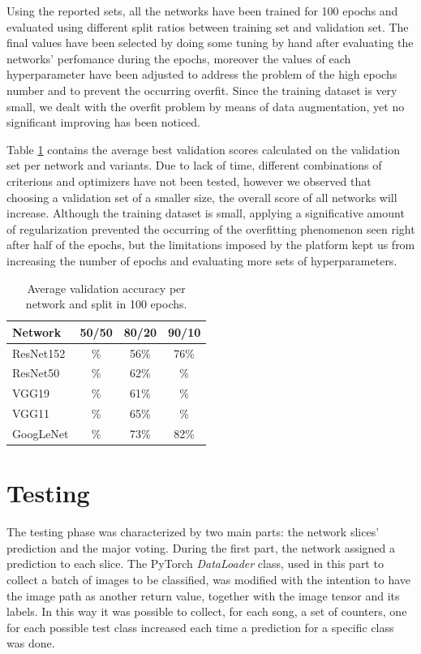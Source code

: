 \documentclass[10pt,twocolumn,letterpaper]{article}
\begin{document}
Using the reported sets, all the networks have been trained for 100 epochs and evaluated using different split ratios between training set and validation set. The final values have been selected by doing some tuning by hand after evaluating the networks' perfomance during the epochs, moreover the values of each hyperparameter have been adjusted to address the problem of the high epochs number and to prevent the occurring overfit. Since the training dataset is very small, we dealt with the overfit problem by means of data augmentation, yet no significant improving has been noticed.

Table \ref{tab:val} contains the average best validation scores calculated on the validation set per network and variants. Due to lack of time, different combinations of criterions and optimizers have not been tested, however we observed that choosing a validation set of a smaller size, the overall score of all networks will increase. Although the training dataset is small, applying a significative amount of regularization prevented the occurring of the overfitting phenomenon seen right after half of the epochs, but the limitations imposed by the platform kept us from increasing the number of epochs and evaluating more sets of hyperparameters.

\begin{table}[ht]
   \begin{center}
   \def\arraystretch{1.5}
   \begin{tabular}{l|c|c|c}
      \textbf{Network} & \textbf{50/50} & \textbf{80/20} & \textbf{90/10} \\
   \hline
   ResNet152 & \% & 56\% & 76\% \\
   \hline
   ResNet50 & \% & 62\% & \% \\
   \hline
   VGG19 & \% & 61\% & \% \\
   \hline
   VGG11 & \% & 65\% & \% \\
   \hline
   GoogLeNet & \% & 73\% & 82\% \\
   \end{tabular}
   \end{center}
   \caption{Average validation accuracy per network and split in 100 epochs.}
   \label{tab:val}
   \end{table}

\section{Testing}\label{testing}

The testing phase was characterized by two main parts: the network slices' prediction and the major voting.
During the first part, the network assigned a prediction to each slice. The PyTorch \textit{DataLoader} class, used in this part to collect a batch of images to be classified, was modified with the intention to have the image path as another return value, together with the image tensor and its labels. In this way it was possible to collect, for each song, a set of counters, one for each possible test class increased each time a prediction for a specific class was done.
\end{document}
